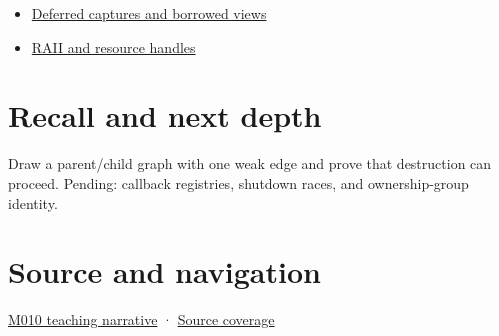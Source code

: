 \begin{itemize}
\tightlist
\item
  \hyperref[appendix-aea529eb5175]{Deferred captures and borrowed views}
\item
  \hyperref[appendix-69739d3ab49b]{RAII and resource handles}
\end{itemize}

\section{Recall and next depth}\label{appendix-b9548675eb2b-recall-and-next-depth}

Draw a parent/child graph with one weak edge and prove that destruction can proceed. Pending: callback registries, shutdown races, and ownership-group identity.

\section{Source and navigation}\label{appendix-b9548675eb2b-source-and-navigation}

\href{Continuous\%20Notes/Computing\%20Foundations\%20-\%20From\%20Bits\%20to\%20C++\%20and\%20Systems\%20APIs\#Weak\%20observation\%20breaks\%20cycles\%20without\%20pretending\%20an\%20object\%20is\%20alive}{M010 teaching narrative} · \hyperref[appendix-fd090d982a15-m010---parts-148-160]{Source coverage}
